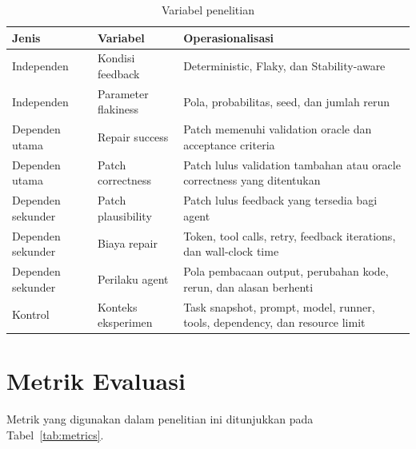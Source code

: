 \begin{table}[htbp]
\centering
\small
\renewcommand{\arraystretch}{1.25}
\caption{Variabel penelitian}
\label{tab:variables}
\begin{tabularx}{\textwidth}{p{3.0cm}p{3.5cm}Y}
\toprule
\textbf{Jenis} & \textbf{Variabel} & \textbf{Operasionalisasi} \\
\midrule
Independen & Kondisi feedback & Deterministic, Flaky, dan Stability-aware \\
Independen & Parameter flakiness & Pola, probabilitas, seed, dan jumlah rerun \\
Dependen utama & Repair success & Patch memenuhi validation oracle dan acceptance criteria \\
Dependen utama & Patch correctness & Patch lulus validation tambahan atau oracle correctness yang ditentukan \\
Dependen sekunder & Patch plausibility & Patch lulus feedback yang tersedia bagi agent \\
Dependen sekunder & Biaya repair & Token, tool calls, retry, feedback iterations, dan wall-clock time \\
Dependen sekunder & Perilaku agent & Pola pembacaan output, perubahan kode, rerun, dan alasan berhenti \\
Kontrol & Konteks eksperimen & Task snapshot, prompt, model, runner, tools, dependency, dan resource limit \\
\bottomrule
\end{tabularx}
\end{table}

\section{Metrik Evaluasi}

Metrik yang digunakan dalam penelitian ini ditunjukkan pada Tabel~\ref{tab:metrics}.

